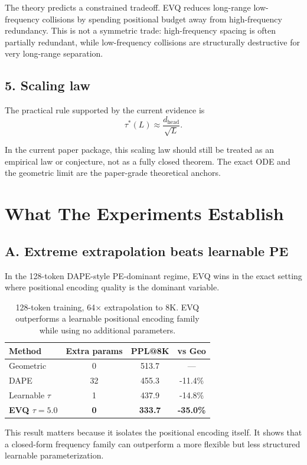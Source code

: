 \documentclass[11pt]{article}
\begin{document}
The theory predicts a constrained tradeoff. EVQ reduces long-range low-frequency
collisions by spending positional budget away from high-frequency redundancy.
This is not a symmetric trade: high-frequency spacing is often partially
redundant, while low-frequency collisions are structurally destructive for very
long-range separation.

\subsection*{5. Scaling law}

The practical rule supported by the current evidence is
\[
\tau^*(L)\approx \frac{d_{\text{head}}}{\sqrt{L}}.
\]

In the current paper package, this scaling law should still be treated as an
empirical law or conjecture, not as a fully closed theorem. The exact ODE and
the geometric limit are the paper-grade theoretical anchors.

\section*{What The Experiments Establish}

\subsection*{A. Extreme extrapolation beats learnable PE}

In the 128-token DAPE-style PE-dominant regime, EVQ wins in the exact setting
where positional encoding quality is the dominant variable.

\begin{table}[H]
\centering
\small
\begin{tabular}{lccc}
\toprule
Method & Extra params & PPL@8K & vs Geo \\
\midrule
Geometric & 0 & 513.7 & --- \\
DAPE & 32 & 455.3 & -11.4\% \\
Learnable $\tau$ & 1 & 437.9 & -14.8\% \\
\textbf{EVQ $\tau=5.0$} & \textbf{0} & \textbf{333.7} & \textbf{-35.0\%} \\
\bottomrule
\end{tabular}
\caption{128-token training, 64$\times$ extrapolation to 8K. EVQ outperforms a learnable positional encoding family while using no additional parameters.}
\end{table}

This result matters because it isolates the positional encoding itself. It
shows that a closed-form frequency family can outperform a more flexible but
less structured learnable parameterization.
\end{document}
